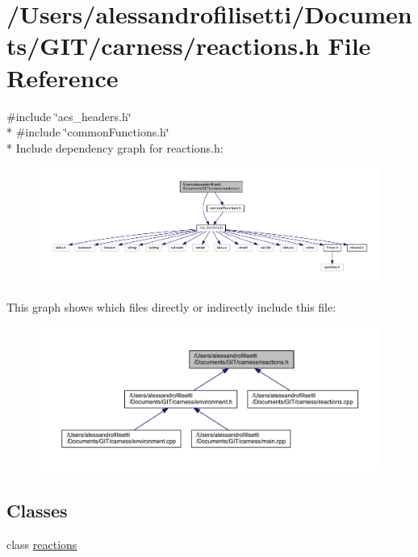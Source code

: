 \hypertarget{a00077}{\section{/\+Users/alessandrofilisetti/\+Documents/\+G\+I\+T/carness/reactions.h File Reference}
\label{a00077}
}
{\ttfamily \#include \char`\"{}acs\+\_\+headers.\+h\char`\"{}}\\*
{\ttfamily \#include \char`\"{}common\+Functions.\+h\char`\"{}}\\*
Include dependency graph for reactions.\+h\+:\nopagebreak
\begin{figure}[H]
\begin{center}
\leavevmode
\includegraphics[width=350pt]{a00200}
\end{center}
\end{figure}
This graph shows which files directly or indirectly include this file\+:\nopagebreak
\begin{figure}[H]
\begin{center}
\leavevmode
\includegraphics[width=350pt]{a00201}
\end{center}
\end{figure}
\subsection*{Classes}
\begin{DoxyCompactItemize}
\item 
class \hyperlink{a00020}{reactions}
\end{DoxyCompactItemize}
